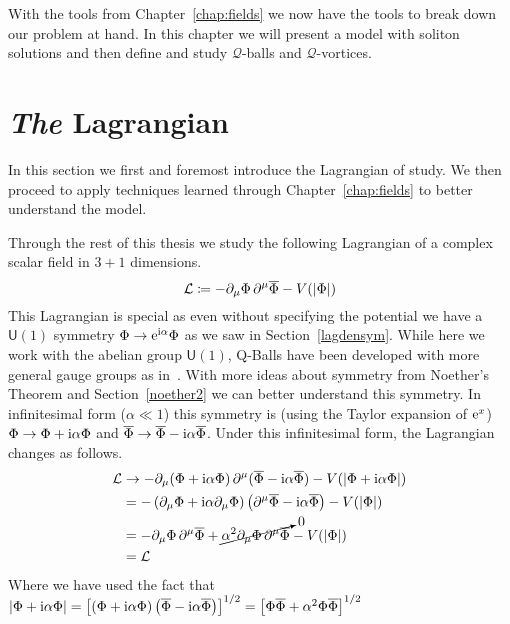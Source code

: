 
With the tools from Chapter~\ref{chap:fields} we now have the tools to break
down our problem at hand. In this chapter we will present a model with soliton
solutions and then define and study \(\mathcal{Q}\)-balls and
\(\mathcal{Q}\)-vortices.

\section{\textit{The} Lagrangian}
In this section we first and foremost introduce the Lagrangian of study. We then
proceed to apply techniques learned through Chapter~\ref{chap:fields} to better
understand the model.

Through the rest of this thesis we study the following Lagrangian of a complex
scalar field in \(3+1\) dimensions.
\begin{equation}\label{eq:complexlag}
    \mathcal{L}\coloneqq -\partial_\mu\Phi\,\partial^\mu\overline{\Phi} - V(|\Phi|)
\end{equation}
This Lagrangian is special as even without specifying the potential we have a
\(\mathsf{U}(1)\) symmetry \(\Phi \to \mathrm{e}^{\mathrm{i}\alpha}\Phi\) as we saw in
Section~\ref{lagdensym}. While here we work with the abelian group
\(\mathsf{U}(1)\), Q-Balls have been developed with more general gauge groups as
in~\cite{nonabelian}. With more ideas about symmetry from Noether's Theorem and
Section~\ref{noether2} we can better understand this symmetry. In infinitesimal
form (\(\alpha\ll 1\)) this symmetry is (using the Taylor expansion of \(\mathrm{e}^x\))
\(\Phi \to \Phi + \mathrm{i}\alpha\Phi\) and \(\overline{\Phi} \to \overline{\Phi} - \mathrm{i}\alpha\overline{\Phi}\).
Under this infinitesimal form, the Lagrangian changes as follows.
\begin{align}
    \mathcal{L} & \to -\partial_\mu(\Phi + \mathrm{i}\alpha\Phi)\,\partial^\mu(\overline{\Phi} - \mathrm{i}\alpha\overline{\Phi}) - V(|\Phi + \mathrm{i}\alpha\Phi|) \\
         & = -\left(\partial_\mu\Phi + \mathrm{i}\alpha\partial_\mu\Phi\right)\left(\partial^\mu\overline{\Phi} - \mathrm{i}\alpha\overline{\Phi}\right) - V(|\Phi|) \\
         & = -\partial_\mu\Phi\,\partial^\mu\overline{\Phi} + \cancelto{0}{\alpha^2\partial_\mu\Phi\,\partial^\mu\overline{\Phi}} - V(|\Phi|) \\
         & = \mathcal{L}
\end{align}
Where we have used the fact that \(|\Phi + \mathrm{i}\alpha\Phi| = \left[\left(\Phi + \mathrm{i}\alpha\Phi\right)\left(\overline{\Phi} - \mathrm{i}\alpha\overline{\Phi}\right)\right]^{1/2} = \left[\Phi\overline{\Phi} + \alpha^2\Phi\overline{\Phi}\right]^{1/2}\)
